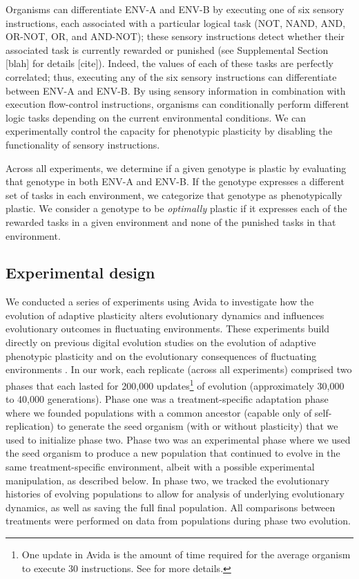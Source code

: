 Organisms can differentiate ENV-A and ENV-B by executing one of six sensory instructions, each associated with a particular logical task (NOT, NAND, AND, OR-NOT, OR, and AND-NOT); these sensory instructions detect whether their associated task is currently rewarded or punished (see Supplemental Section [blah] for details [cite]).
Indeed, the values of each of these tasks are perfectly correlated; thus, executing any of the six sensory instructions can differentiate between ENV-A and ENV-B. 
By using sensory information in combination with execution flow-control instructions, organisms can conditionally perform different logic tasks depending on the current environmental conditions.
We can experimentally control the capacity for phenotypic plasticity by disabling the functionality of sensory instructions.

Across all experiments, we determine if a given genotype is plastic by evaluating that genotype in both ENV-A and ENV-B. 
If the genotype expresses a different set of tasks in each environment, we categorize that genotype as phenotypically plastic.
We consider a genotype to be \textit{optimally} plastic if it expresses each of the rewarded tasks in a given environment and none of the punished tasks in that environment.

\vspace{0.7cm}
\subsection{Experimental design}

We conducted a series of experiments using Avida to investigate how the evolution of adaptive plasticity alters evolutionary dynamics and influences evolutionary outcomes in fluctuating environments.
These experiments build directly on previous digital evolution studies on the evolution of adaptive phenotypic plasticity \citep{clune_investigating_2007,lalejini_evolutionary_2016} and on the evolutionary consequences of fluctuating environments \citep{wilke_evolution_2001,canino-koning_fluctuating_2019}.
In our work, each replicate (across all experiments) comprised two phases that each lasted for 200,000 updates\footnote{
    One update in Avida is the amount of time required for the average organism to execute 30 instructions. 
    See \citep{ofria_avida:_2009} for more details.
} 
of evolution (approximately 30,000 to 40,000 generations).  
Phase one was a treatment-specific adaptation phase where we founded populations with a common ancestor (capable only of self-replication) to generate the seed organism (with or without plasticity) that we used to initialize phase two.
Phase two was an experimental phase where we used the seed organism to produce a new population that continued to evolve in the same treatment-specific environment, albeit with a possible experimental manipulation, as described below.
In phase two, we tracked the evolutionary histories of evolving populations to allow for analysis of underlying evolutionary dynamics, as well as saving the full final population.
All comparisons between treatments were performed on data from populations during phase two evolution.

